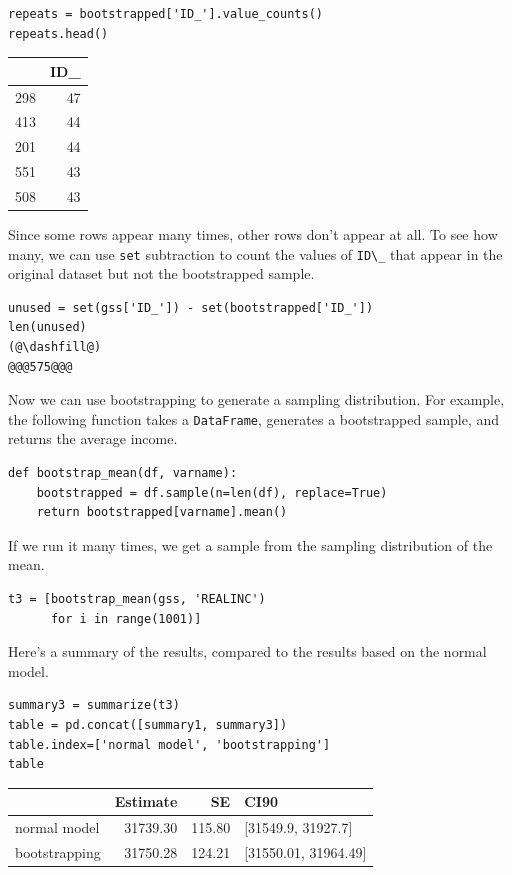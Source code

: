 \begin{lstlisting}[]
repeats = bootstrapped['ID_'].value_counts()
repeats.head()
\end{lstlisting}

\begin{tabular}{lr}
\midrule
{} &  ID\_ \\
\midrule
298 &   47 \\
413 &   44 \\
201 &   44 \\
551 &   43 \\
508 &   43 \\
\midrule
\end{tabular}

Since some rows appear many times, other rows don't appear at all. To
see how many, we can use \passthrough{\lstinline!set!} subtraction to
count the values of \passthrough{\lstinline!ID\_!} that appear in the
original dataset but not the bootstrapped sample.

\begin{lstlisting}[]
unused = set(gss['ID_']) - set(bootstrapped['ID_'])
len(unused)
(@\dashfill@)
@@@575@@@
\end{lstlisting}

Now we can use bootstrapping to generate a sampling distribution. For
example, the following function takes a
\passthrough{\lstinline!DataFrame!}, generates a bootstrapped sample,
and returns the average income.

\begin{lstlisting}[]
def bootstrap_mean(df, varname):
    bootstrapped = df.sample(n=len(df), replace=True)
    return bootstrapped[varname].mean()
\end{lstlisting}

If we run it many times, we get a sample from the sampling distribution
of the mean.

\begin{lstlisting}[]
t3 = [bootstrap_mean(gss, 'REALINC')
      for i in range(1001)]
\end{lstlisting}

Here's a summary of the results, compared to the results based on the
normal model.

\begin{lstlisting}[]
summary3 = summarize(t3)
table = pd.concat([summary1, summary3])
table.index=['normal model', 'bootstrapping']
table
\end{lstlisting}

\begin{tabular}{lrrl}
\midrule
{} &  Estimate &      SE &                  CI90 \\
\midrule
normal model  &  31739.30 &  115.80 &    [31549.9, 31927.7] \\
bootstrapping &  31750.28 &  124.21 &  [31550.01, 31964.49] \\
\midrule
\end{tabular}


